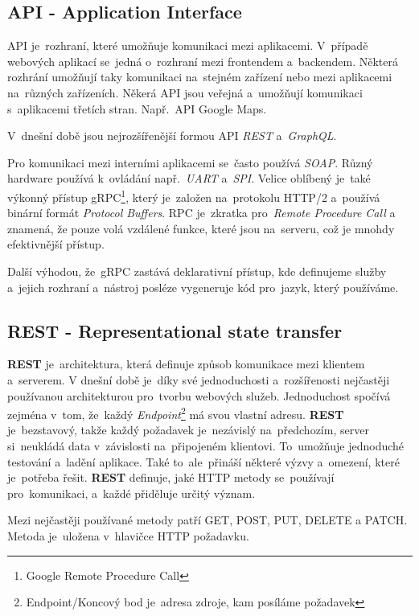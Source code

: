 \documentclass[14pt]{article}
\begin{document}
        \subsection{API - Application Interface}
        API je~rozhraní, které umožňuje komunikaci mezi aplikacemi. V~případě webových aplikací se~jedná o~rozhraní mezi frontendem a~backendem.
        Některá rozhrání umožňují taky komunikaci na~stejném zařízení nebo mezi aplikacemi na~různých zařízeních.
        Někerá API jsou veřejná a~umožňují komunikaci s~aplikacemi třetích stran. Např.~API Google Maps.

        V~dnešní době jsou nejrozšířenější formou API \emph{REST} a~\emph{GraphQL}.

        Pro komunikaci mezi interními aplikacemi se~často používá \emph{SOAP}. Různý hardware používá k~ovládání např.~\emph{UART} a~\emph{SPI}.
        Velice oblíbený je~také výkonný přístup gRPC\footnote{Google Remote Procedure Call}, který je~založen na~protokolu HTTP/2 a~používá binární formát \emph{Protocol Buffers}.
        RPC je~zkratka pro~\emph{Remote Procedure Call} a znamená, že pouze volá vzdálené funkce, které jsou na~serveru,
        což je mnohdy efektivnější přístup.
        
        Další výhodou, že~gRPC zastává deklarativní přístup, kde definujeme služby a~jejich rozhraní a~nástroj posléze vygeneruje kód pro~jazyk, který používáme.

        \subsection{REST - Representational state transfer}
        \textbf{REST} je~architektura, která definuje způsob komunikace mezi klientem a~serverem.
        V dnešní době je~díky své jednoduchosti a~rozšířenosti nejčastěji používanou architekturou pro~tvorbu webových služeb.
        Jednoduchost spočívá zejména v~tom, že~každý \emph{Endpoint}\footnote{Endpoint/Koncový bod je~adresa zdroje, kam posíláme požadavek}
        má svou vlastní adresu.
        \textbf{REST} je~bezstavový, takže každý požadavek je~nezávislý na~předchozím, server si~neukládá data v~závislosti na~připojeném klientovi.
        To~umožňuje jednoduché testování a~ladění aplikace. Také to~ale~přináší některé výzvy a~omezení, které je~potřeba řešit.
        \textbf{REST} definuje, jaké HTTP metody se~používají pro~komunikaci, a~každé přiděluje určitý význam.
    
        Mezi nejčastěji používané metody patří GET, POST, PUT, DELETE a PATCH. Metoda je~uložena v~hlavičce HTTP požadavku.
\end{document}

